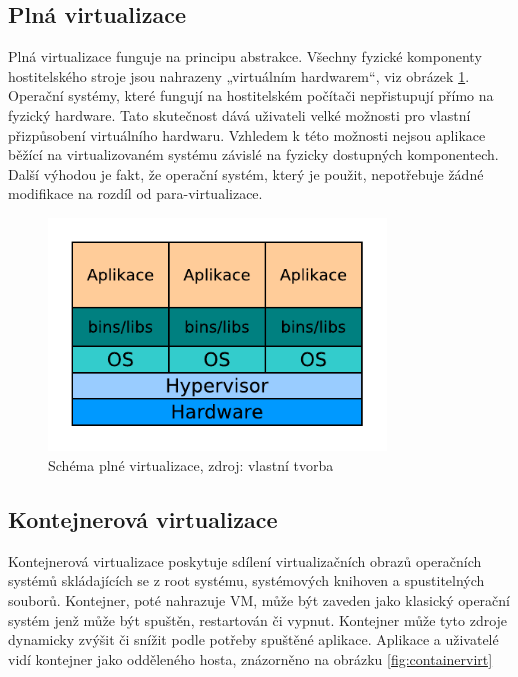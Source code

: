 \subsection{Plná virtualizace}
Plná virtualizace funguje na principu abstrakce. Všechny fyzické komponenty hostitelského stroje jsou nahrazeny „virtuálním hardwarem“, viz obrázek \ref{fig:fullvirt}. Operační systémy, které fungují na hostitelském počítači nepřistupují přímo na fyzický hardware. Tato skutečnost dává uživateli velké možnosti pro vlastní přizpůsobení virtuálního hardwaru. Vzhledem k této možnosti nejsou aplikace běžící na virtualizovaném systému závislé na fyzicky dostupných komponentech. Další výhodou je fakt, že operační systém, který je použit, nepotřebuje žádné modifikace na rozdíl od para-virtualizace.

\begin{figure}[H]
\begin{centering}
\includegraphics[width=0.8\textwidth]{img/fullvirt.pdf}
\par\end{centering}
\caption{Schéma plné virtualizace, zdroj: vlastní tvorba} \label{fig:fullvirt}
\end{figure}
 
\subsection{Kontejnerová virtualizace}
Kontejnerová virtualizace poskytuje sdílení virtualizačních obrazů operačních systémů skládajících se z root systému, systémových knihoven a spustitelných souborů. Kontejner, poté nahrazuje VM, může být zaveden jako klasický operační systém jenž může být spuštěn, restartován či vypnut. Kontejner může tyto zdroje dynamicky zvýšit či snížit podle potřeby spuštěné aplikace. Aplikace a uživatelé vidí kontejner jako odděleného hosta, znázorněno na obrázku \ref{fig:containervirt}

